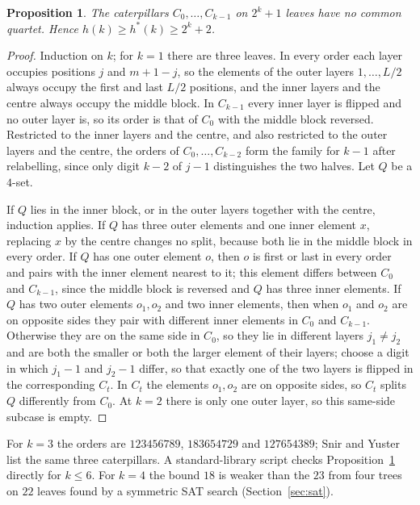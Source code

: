 \documentclass[11pt]{amsart}
\newtheorem{proposition}[theorem]{Proposition}
\theoremstyle{remark}
\begin{document}
\begin{proposition}\label{prop:cat}
The caterpillars $C_0,\dots,C_{k-1}$ on $2^k+1$ leaves have no common quartet. Hence $h(k)\ge h^*(k)\ge2^k+2$.
\end{proposition}

\begin{proof}
Induction on $k$; for $k=1$ there are three leaves. In every order each layer occupies positions $j$ and $m+1-j$, so the elements of the outer layers $1,\dots,L/2$ always occupy the first and last $L/2$ positions, and the inner layers and the centre always occupy the middle block. In $C_{k-1}$ every inner layer is flipped and no outer layer is, so its order is that of $C_0$ with the middle block reversed. Restricted to the inner layers and the centre, and also restricted to the outer layers and the centre, the orders of $C_0,\dots,C_{k-2}$ form the family for $k-1$ after relabelling, since only digit $k-2$ of $j-1$ distinguishes the two halves. Let $Q$ be a $4$-set.

If $Q$ lies in the inner block, or in the outer layers together with the centre, induction applies. If $Q$ has three outer elements and one inner element $x$, replacing $x$ by the centre changes no split, because both lie in the middle block in every order. If $Q$ has one outer element $o$, then $o$ is first or last in every order and pairs with the inner element nearest to it; this element differs between $C_0$ and $C_{k-1}$, since the middle block is reversed and $Q$ has three inner elements. If $Q$ has two outer elements $o_1,o_2$ and two inner elements, then when $o_1$ and $o_2$ are on opposite sides they pair with different inner elements in $C_0$ and $C_{k-1}$. Otherwise they are on the same side in $C_0$, so they lie in different layers $j_1\ne j_2$ and are both the smaller or both the larger element of their layers; choose a digit in which $j_1-1$ and $j_2-1$ differ, so that exactly one of the two layers is flipped in the corresponding $C_t$. In $C_t$ the elements $o_1,o_2$ are on opposite sides, so $C_t$ splits $Q$ differently from $C_0$. At $k=2$ there is only one outer layer, so this same-side subcase is empty.
\end{proof}

For $k=3$ the orders are $123456789$, $183654729$ and $127654389$; Snir and Yuster~\cite[Sec.~5]{SY2026} list the same three caterpillars. A standard-library script checks Proposition~\ref{prop:cat} directly for $k\le6$. For $k=4$ the bound $18$ is weaker than the $23$ from four trees on $22$ leaves found by a symmetric SAT search (Section~\ref{sec:sat}).
\end{document}
